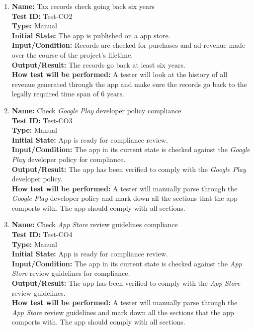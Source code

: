 \documentclass[12pt, titlepage]{article}
\begin{document}
\begin{enumerate}
\begin{enumerate}
    \item
    \textbf{Name:} Tax records check going back six years \label{itm:Test-CO2} \\
    \textbf{Test ID:} Test-CO2 \\
    \textbf{Type:} Manual \\
    \textbf{Initial State:} The app is published on a app store. \\
    \textbf{Input/Condition:} Records are checked for purchases and ad-revenue made over the course of the project's lifetime. \\
    \textbf{Output/Result:} The records go back at least six years. \\
    \textbf{How test will be performed:} A tester will look at the history of all revenue generated through the app and make sure the records go back to the legally required time span of 6 years.

    \item
    \textbf{Name:} Check \textit{Google Play} developer policy \cite{GooglePlay} compliance \label{itm:Test-CO3} \\
    \textbf{Test ID:} Test-CO3 \\
    \textbf{Type:} Manual \\
    \textbf{Initial State:} App is ready for compliance review. \\
    \textbf{Input/Condition:} The app in its current state is checked against the \textit{Google Play} developer policy for compliance. \\
    \textbf{Output/Result:} The app has been verified to comply with the \textit{Google Play} developer policy. \\
    \textbf{How test will be performed:} A tester will manually parse through the \textit{Google Play} developer policy and mark down all the sections that the app comports with. The app should comply with all sections.

    \item
    \textbf{Name:} Check \textit{App Store} review guidelines \cite{AppStore} compliance \label{itm:Test-CO4} \\
    \textbf{Test ID:} Test-CO4 \\
    \textbf{Type:} Manual \\
    \textbf{Initial State:} App is ready for compliance review. \\
    \textbf{Input/Condition:} The app in its current state is checked against the \textit{App Store} review guidelines for compliance. \\
    \textbf{Output/Result:} The app has been verified to comply with the \textit{App Store} review guidelines. \\
    \textbf{How test will be performed:} A tester will manually parse through the \textit{App Store} review guidelines and mark down all the sections that the app comports with. The app should comply with all sections.


\end{enumerate}
\end{enumerate}
\end{document}
